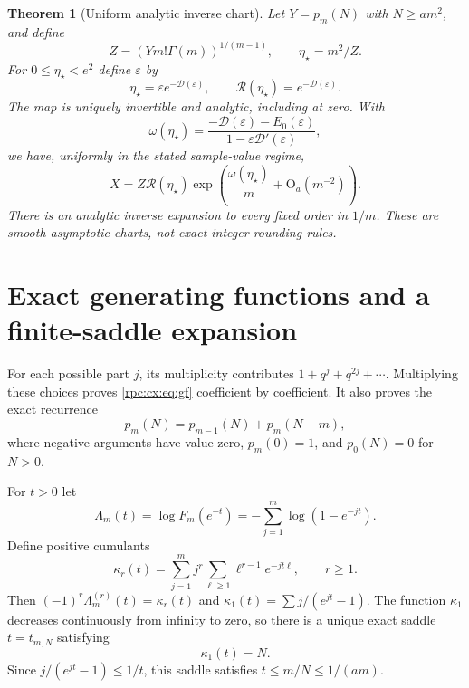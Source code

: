 \documentclass[11pt]{article}
\newtheorem{theorem}{Theorem}[section]
\theoremstyle{definition}
\theoremstyle{remark}
\numberwithin{equation}{section}
\begin{document}
\begin{theorem}[Uniform analytic inverse chart]\label{rpc:cx:thm:inverse-intro}
Let $Y=p_m(N)$ with $N\ge am^2$, and define
\begin{equation}\label{rpc:cx:eq:inverse-input}
 Z=(Y m!\Gamma(m))^{1/(m-1)},\qquad \eta_\star=m^2/Z.
\end{equation}
For $0\le\eta_\star<e^2$ define $\varepsilon$ by
\begin{equation}\label{rpc:cx:eq:inverse-core}
 \eta_\star=\varepsilon e^{-\mathcal D(\varepsilon)},\qquad \mathcal R(\eta_\star)=e^{-\mathcal D(\varepsilon)}.
\end{equation}
The map is uniquely invertible and analytic, including at zero. With
\begin{equation}\label{rpc:cx:eq:v}
 \omega(\eta_\star)=\frac{-\mathcal D(\varepsilon)-E_0(\varepsilon)}{1-\varepsilon \mathcal D'(\varepsilon)},
\end{equation}
we have, uniformly in the stated sample-value regime,
\begin{equation}\label{rpc:cx:eq:inverse-first}
 X=Z\mathcal R(\eta_\star)\exp\!\left(\frac{\omega(\eta_\star)}m+\mathrm O_a(m^{-2})\right).
\end{equation}
There is an analytic inverse expansion to every fixed order in $1/m$.
These are smooth asymptotic charts, not exact integer-rounding rules.
\end{theorem}

\section{Exact generating functions and a finite-saddle expansion}
\label{rpc:cx:sec:finite}
For each possible part $j$, its multiplicity contributes
$1+q^j+q^{2j}+\cdots$. Multiplying these choices proves
\eqref{rpc:cx:eq:gf} coefficient by coefficient. It also proves the exact
recurrence
\begin{equation}\label{rpc:cx:eq:dp}
 p_m(N)=p_{m-1}(N)+p_m(N-m),
\end{equation}
where negative arguments have value zero, $p_m(0)=1$, and
$p_0(N)=0$ for $N>0$.

For $t>0$ let
\begin{equation}
 \Lambda_m(t)=\log F_m(e^{-t})=-\sum_{j=1}^m\log(1-e^{-jt}).
\end{equation}
Define positive cumulants
\begin{equation}\label{rpc:cx:eq:cumulants}
 \kappa_r(t)=\sum_{j=1}^m j^r
       \sum_{\ell\ge1}\ell^{r-1}e^{-jt\ell},\qquad r\ge1.
\end{equation}
Then $(-1)^r\Lambda_m^{(r)}(t)=\kappa_r(t)$ and
$\kappa_1(t)=\sum j/(e^{jt}-1)$.
The function $\kappa_1$ decreases continuously from infinity to zero,
so there is a unique exact saddle $t=t_{m,N}$ satisfying
\begin{equation}\label{rpc:cx:eq:exact-saddle}
 \kappa_1(t)=N.
\end{equation}
Since $j/(e^{jt}-1)\le1/t$, this saddle satisfies
$t\le m/N\le1/(am)$.
\end{document}
